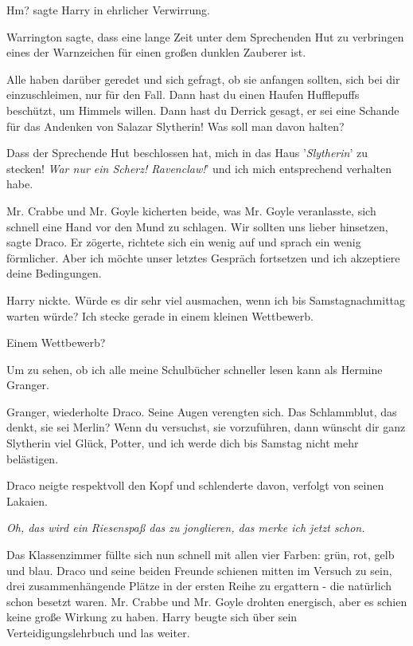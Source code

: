 \glqq{}Hm?\grqq{} sagte Harry in ehrlicher Verwirrung.

\glqq{}Warrington sagte, dass eine lange Zeit unter dem Sprechenden Hut zu
verbringen eines der Warnzeichen für einen großen dunklen Zauberer ist.

Alle haben darüber geredet und sich gefragt, ob sie anfangen sollten, sich bei
dir einzuschleimen, nur für den Fall. Dann hast du einen Haufen Hufflepuffs
beschützt, um Himmels willen. Dann hast du Derrick gesagt, er sei eine Schande
für das Andenken von Salazar Slytherin! Was soll man davon halten?\grqq{}

\glqq{}Dass der Sprechende Hut beschlossen hat, mich in das Haus
'\emph{Slytherin}' zu stecken! \emph{War nur ein Scherz! Ravenclaw!}' und ich
mich entsprechend verhalten habe.\grqq{}

Mr. Crabbe und Mr. Goyle kicherten beide, was Mr. Goyle veranlasste, sich
schnell eine Hand vor den Mund zu schlagen. \glqq{}Wir sollten uns lieber
hinsetzen\grqq{}, sagte Draco. Er zögerte, richtete sich ein wenig auf und
sprach ein wenig förmlicher. \glqq{}Aber ich möchte unser letztes Gespräch
fortsetzen und ich akzeptiere deine Bedingungen.\grqq{}

Harry nickte. \glqq{}Würde es dir sehr viel ausmachen, wenn ich bis
Samstagnachmittag warten würde? Ich stecke gerade in einem kleinen
Wettbewerb.\grqq{}

\glqq{}Einem Wettbewerb?\grqq{}

\glqq{}Um zu sehen, ob ich alle meine Schulbücher schneller lesen kann als
Hermine Granger.\grqq{}

\glqq{}Granger\grqq{}, wiederholte Draco. Seine Augen verengten sich. \glqq{}Das
Schlammblut, das denkt, sie sei Merlin? Wenn du versuchst, sie vorzuführen, dann
wünscht dir ganz Slytherin viel Glück, Potter, und ich werde dich bis Samstag
nicht mehr belästigen.\grqq{}

Draco neigte respektvoll den Kopf und schlenderte davon, verfolgt von seinen
Lakaien.

\emph{Oh, das wird ein Riesenspaß das zu jonglieren, das merke ich jetzt schon.}

Das Klassenzimmer füllte sich nun schnell mit allen vier Farben: grün, rot, gelb
und blau. Draco und seine beiden Freunde schienen mitten im Versuch zu sein,
drei zusammenhängende Plätze in der ersten Reihe zu ergattern - die natürlich
schon besetzt waren. Mr. Crabbe und Mr. Goyle drohten energisch, aber es schien
keine große Wirkung zu haben. Harry beugte sich über sein Verteidigungslehrbuch
und las weiter.

